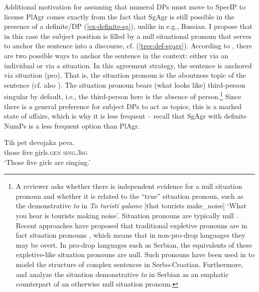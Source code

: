 \documentclass[output=paper,colorlinks,citecolor=brown
]{langscibook}
\begin{document}
\noindent Additional motivation for assuming that numeral DPs must move to SpecIP to license PlAgr comes exactly from the fact that SgAgr is still possible in the presence of a definite/DP (\ref{ex-definite-sg}), unlike in e.g., Russian. I propose that in this case the subject position is filled by a null situational pronoun that serves to anchor the sentence into a discourse, cf. (\ref{tree:def-sgagr}). According to \citet{Hinterholzl2019, Hinterholzl2024es, Hinterholzl2024subjects}, there are two possible ways to anchor the sentence in the context: either via an individual or via a situation. In this agreement strategy, the sentence is anchored via situation (pro). That is, the situation pronoun is the aboutness topic of the sentence (cf. also \citealt{Erteschik-Shir1997, Basilico2003}). The situation pronoun bears (what looks like) third-person singular by default, i.e., the third-person here is the absence of person.\footnote{A reviewer asks whether there is independent evidence for a null situation pronoun and whether it is related to the “true” situation pronoun, such as the demonstrative \textit{to} in \textit{To turisti galame} [that tourists make\_noise] ‘What you hear is tourists making noise’. Situation pronouns are typically null \citep{kratzer2004covert, kratzer2021situations, schwarz2009definites}. Recent approaches have proposed that traditional expletive pronouns are in fact situation pronouns \citep{klein2008topic, Hinterholzl2019, Hinterholzl2024es}, which means that in non-pro-drop languages they may be overt. In pro-drop languages such as Serbian, the equivalents of these expletive-like situation pronouns are null. Such pronouns have been used in \citet{arsenijevic2021situation, milosavljevic2024standard, MilosavljevicMilosavljevicAccepted} to model the structure of complex sentences in Serbo-Croatian. Furthermore, \citet{milosavljevic2022intensifying} and \citet{MilosavljevicMilosavljevicAccepted} analyze the situation demonstrative \textit{to} in Serbian as an emphatic counterpart of an otherwise null situation pronoun.} 
Since there is a general preference for subject DPs to act as topics, this is a marked state of affairs, which is why it is less frequent -- recall that SgAgr with definite NumPs is a less frequent option than PlAgr. 


\ea \label{ex-definite-sg}
 \gll Tih pet devojaka peva. \\
those five girls.\textsc{gen} \textsc{sing.3sg} \\
\glt `Those five girls are singing.'
\z
\end{document}

